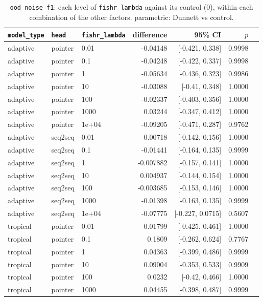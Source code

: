 \documentclass[10pt]{article}
\begin{document}
{\small
\begin{longtable}{lllrrrl}
\caption{\texttt{ood\_noise\_f1}: each level of \texttt{fishr\_lambda} against its control (0), within each combination of the other factors. parametric: Dunnett vs control.}\label{tab:control-ood_noise_f1}\\
\toprule
\texttt{model\_type} & \texttt{head} & \texttt{fishr\_lambda} & difference & 95\% CI & $p$ & \\
\midrule
\endhead
adaptive & pointer & 0.01 & -0.04148 & [-0.421, 0.338] & 0.9998 & \\
adaptive & pointer & 0.1 & -0.04248 & [-0.422, 0.337] & 0.9998 & \\
adaptive & pointer & 1 & -0.05634 & [-0.436, 0.323] & 0.9986 & \\
adaptive & pointer & 10 & -0.03088 & [-0.41, 0.348] & 1.0000 & \\
adaptive & pointer & 100 & -0.02337 & [-0.403, 0.356] & 1.0000 & \\
adaptive & pointer & 1000 & 0.03244 & [-0.347, 0.412] & 1.0000 & \\
adaptive & pointer & 1e+04 & -0.09205 & [-0.471, 0.287] & 0.9762 & \\
adaptive & seq2seq & 0.01 & 0.00718 & [-0.142, 0.156] & 1.0000 & \\
adaptive & seq2seq & 0.1 & -0.01441 & [-0.164, 0.135] & 0.9999 & \\
adaptive & seq2seq & 1 & -0.007882 & [-0.157, 0.141] & 1.0000 & \\
adaptive & seq2seq & 10 & 0.004937 & [-0.144, 0.154] & 1.0000 & \\
adaptive & seq2seq & 100 & -0.003685 & [-0.153, 0.146] & 1.0000 & \\
adaptive & seq2seq & 1000 & -0.01398 & [-0.163, 0.135] & 0.9999 & \\
adaptive & seq2seq & 1e+04 & -0.07775 & [-0.227, 0.0715] & 0.5607 & \\
tropical & pointer & 0.01 & 0.01799 & [-0.425, 0.461] & 1.0000 & \\
tropical & pointer & 0.1 & 0.1809 & [-0.262, 0.624] & 0.7767 & \\
tropical & pointer & 1 & 0.04363 & [-0.399, 0.486] & 0.9999 & \\
tropical & pointer & 10 & 0.09004 & [-0.353, 0.533] & 0.9909 & \\
tropical & pointer & 100 & 0.0232 & [-0.42, 0.466] & 1.0000 & \\
tropical & pointer & 1000 & 0.04455 & [-0.398, 0.487] & 0.9999 & \\

\end{longtable}}
\end{document}
